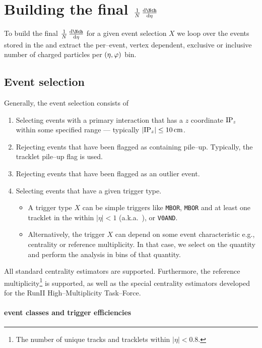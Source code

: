 \section{Building the final $\ndndeta$}
\label{sec:ana_aod}

To build the final $\ndndeta$ for a given event selection $X$ we loop
over the events stored in the \AOD{} and extract the per--event,
vertex dependent, exclusive or inclusive number of charged particles
per $(\eta,\varphi)$ bin.   

\subsection{Event selection}

Generally, the event selection consists of 
\begin{enumerate}
\item Selecting events with a primary interaction that has a $z$
  coordinate $\IPz$ within some specified range --- typically
  $|\IPz|\le\unit[10]{cm}$. 
\item Rejecting events that have been flagged as containing pile--up.
  Typically, the \SPD{} tracklet pile--up flag is used. 
\item Rejecting events that have been flagged as an \SPD{} outlier
  event. 
\item Selecting events that have a given trigger type.
  \begin{itemize}
  \item A trigger type $X$ can be simple triggers like \texttt{MBOR},
    \texttt{MBOR} and at least one tracklet in the \SPD{} within
    $|\eta|<1$ (a.k.a.~\INELGT{}), or \texttt{V0AND}. 
  \item Alternatively, the trigger $X$ can depend on some event
    characteristic e.g., centrality or reference multiplicity. In that
    case, we select on the quantity and perform the analysis in bins
    of that quantity.
  \end{itemize}
\end{enumerate}

All standard centrality estimators are supported.  Furthermore, the
reference multiplicity\footnote{The number of unique tracks and
  tracklets within $|\eta|<0.8$.} is supported, as well as the special
\ppCol{} centrality estimators developed for the RunII
High--Multiplicity Task--Force.

\paragraph{\ppCol{} event classes and trigger efficiencies} 

